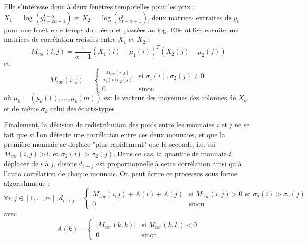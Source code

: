 \documentclass[a4paper, 10pt]{article}
\begin{document}
Elle s'intéresse donc à deux fenêtres temporelles pour les prix : $X_1 = \log \left(y_{t-2\alpha+1}^{t-\alpha} \right)$ et $X_2 = \log \left(y_{t-\alpha+1}^{t}\right)$, deux matrices extraites de $y_t$ pour une fenêtre de temps donnée $\alpha$ et passées au log. Elle utilise ensuite aux matrices de corrélation croisées entre $X_1$ et $X_2$ : 
\begin{equation}
    M_{cov}(i, j) = \frac{1}{\alpha - 1}(X_{1}(i) - \mu_1(i))^{T}(X_2(j) - \mu_2(j))
\end{equation}
et
\begin{equation}
    M_{cor}(i, j) =
        \begin{cases}
            \frac{M_{cov}(i,j)}{\sigma_1(i)\sigma_2(j)} & \text{si } \sigma_1(i), \sigma_2(j) \ne 0 \\
            0                                           & \text{sinon}
        \end{cases}
\end{equation}
où $\mu_k = (\mu_k(1), ..., \mu_k(m))$ est le vecteur des moyennes des colonnes de $X_k$, et de même $\sigma_k$ celui des écarts-types.

Finalement, la décision de redistribution des poids entre les monnaies $i$ et $j$ ne se fait que si l'on détecte une corrélation entre ces deux monnaies, et que la première monnaie se déplace "plus rapidement" que la seconde, i.e. ssi $M_{cor}(i,j) > 0$ et $\sigma_2(i) > \sigma_2(j)$. Dans ce cas, la quantité de monnaie à déplacer de $i$ à $j$, disons $d_{i\rightarrow j}$ est proportionnelle à cette corrélation ainsi qu'à l'auto corrélation de chaque monnaie. On peut écrire ce processus sous forme algorithmique :
\begin{equation}
    \forall i, j \in [1, ..., m], d_{i\rightarrow j} =
        \begin{cases}
            M_{cor}(i,j) + A(i) + A(j) & \text{si } M_{cor}(i,j) > 0 \text{ et } \sigma_2(i) > \sigma_2(j) \\
            0                          & \text{sinon}
        \end{cases}
\end{equation}
avec
\begin{equation}
    A(k) = 
    \begin{cases}
        |M_{cor}(k,k)| & \text{si } M_{cor}(k,k) < 0 \\
        0              & \text{sinon}
    \end{cases}
\end{equation}
\end{document}
